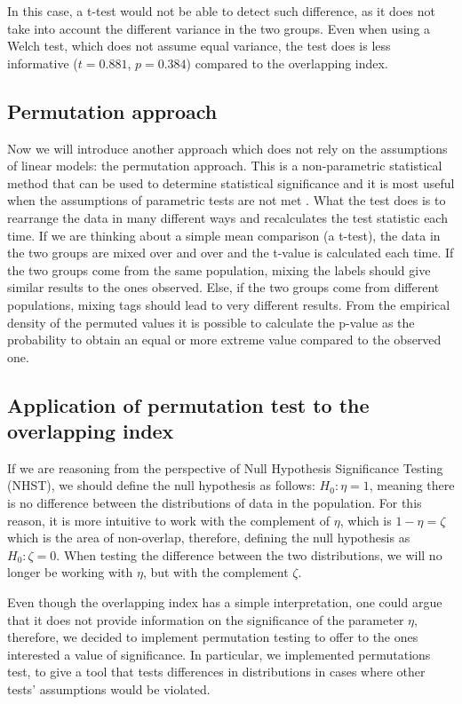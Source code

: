 \documentclass[10pt]{article}\usepackage[]{graphicx}\usepackage[]{xcolor}
\begin{document}
In this case, a t-test would not be able to detect such difference, as it does not take into account the different variance in the two groups. Even when using a Welch test, which does not assume equal variance, the test does is less informative ($t = 0.881$, $p = 0.384$) compared to the overlapping index.

\subsection{Permutation approach}

 Now we will introduce another approach which does not rely on the assumptions of linear models: the permutation approach. This is a non-parametric statistical method that can be used to determine statistical significance and it is most useful when the assumptions of parametric tests are not met \cite{pesarin2010permutation}. What the test does is to rearrange the data in many different ways and recalculates the test statistic each time. If we are thinking about a simple mean comparison (a t-test), the data in the two groups are mixed over and over and the t-value is calculated each time. If the two groups come from the same population, mixing the labels should give similar results to the ones observed. Else, if the two groups come from different populations, mixing tags should lead to very different results. From the empirical density of the permuted values it is possible to calculate the p-value as the probability to obtain an equal or more extreme value compared to the observed one. 

\subsection{Application of permutation test to the overlapping index}

If we are reasoning from the perspective of Null Hypothesis Significance Testing (NHST), we should define the null hypothesis as follows: $H_0: \eta = 1$,  meaning there is no difference between the distributions of data in the population. For this reason, it is more intuitive to work with the complement of $\eta$, which is  $1-\eta = \zeta$ which is the area of non-overlap, therefore, defining the null hypothesis as  $H_0:\zeta = 0$. When testing the difference between the two distributions, we will no longer be working with $\eta$, but with the complement $\zeta$. 

Even though the overlapping index has a simple interpretation, one could argue that it does not provide information on the significance of the parameter $\eta$, therefore, we decided to implement permutation testing to offer to the ones interested a value of significance. In particular, we implemented permutations test, to give a tool that tests differences in distributions in cases where other tests' assumptions would be violated.
\end{document}

